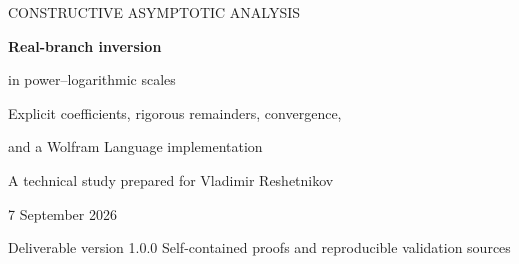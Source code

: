 \documentclass[11pt,a4paper]{article}
\numberwithin{equation}{section}
\theoremstyle{definition}\newtheorem{definition}[theorem]{Definition}
\theoremstyle{remark}\newtheorem{remark}[theorem]{Remark}
\begin{document}
\begin{titlepage}
\vspace*{16mm}
{\color{accent}\large CONSTRUCTIVE ASYMPTOTIC ANALYSIS\par}
\vspace{8mm}
{\color{ink}\Huge\bfseries Real-branch inversion\par
 in power--logarithmic scales\par}
\vspace{8mm}
{\Large Explicit coefficients, rigorous remainders, convergence,\par
 and a Wolfram Language implementation\par}
\vspace{12mm}
{\large A technical study prepared for Vladimir Reshetnikov\par}
{\large 7 September 2026\par}
\vspace{13mm}
\begin{abstract}
We construct the positive-real inverse germ of
\[
 f(x)=a x^p\left(1+\sum_{i=1}^m x^{\delta_i}P_i(\log x)\right),
 \qquad a,p,\delta_i>0,
\]
where the $P_i$ are real polynomials. A normalization fixes the branch
before any expansion is attempted. An explicit multi-index
Lagrange--B\"urmann formula produces every inverse coefficient using only
polynomial differentiation. It works with irrational exponents and
correctly combines coincident exponent sums. A separate truncated
fixed-point algorithm computes the same coefficients by composition.

For this finite-input class the resulting grouped power--logarithmic
expansion is not merely formal: it converges for all sufficiently small
positive arguments. We prove this through a finite-dimensional analytic
lifting, provide a usable complex contraction criterion, and derive a
log-sensitive first-omitted-layer remainder. The two motivating examples,
$x+x^2(1+\log x)$ and $x+x^{\sqrt2}$, receive explicit formulas and detailed
branch analyses. The accompanying reference package implements exact
algebraic exponents, symbolic real coefficients under assumptions, powers
of the inverse, and formal residual checks. Its validation record
separates independently executed exact-arithmetic checks from native
Wolfram tests that were supplied but could not be run in the available
execution environment.
\end{abstract}
\vfill
{\small Deliverable version 1.0.0\quad\textbullet\quad
 Self-contained proofs and reproducible validation sources}
\end{titlepage}
\tableofcontents
\newpage
\end{document}
